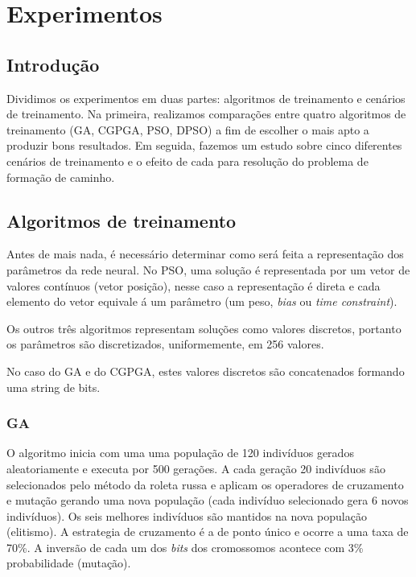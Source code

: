 \chapter{Experimentos}
\label{experimentos}

\section{Introdução}

Dividimos os experimentos em duas partes: algoritmos de treinamento e cenários de treinamento. Na primeira, realizamos comparações entre quatro algoritmos de treinamento (GA, CGPGA, PSO, DPSO) a fim de escolher o mais apto a produzir bons resultados. Em seguida, fazemos um estudo sobre cinco diferentes cenários de treinamento e o efeito de cada para resolução do problema de formação de caminho.

\section{Algoritmos de treinamento}

Antes de mais nada, é necessário determinar como será feita a representação dos parâmetros da rede neural. No PSO, uma solução é representada por um vetor de valores contínuos (vetor posição), nesse caso a representação é direta e cada elemento do vetor equivale á um parâmetro (um peso, \textit{bias} ou \textit{time constraint}).

Os outros três algoritmos representam soluções como valores discretos, portanto os parâmetros são discretizados, uniformemente, em 256 valores.

No caso do GA e do CGPGA, estes valores discretos são concatenados formando uma string de bits.

\subsection{GA}

O algoritmo inicia com uma uma população de 120 indivíduos gerados aleatoriamente e executa por 500 gerações. A cada geração 20 indivíduos são selecionados pelo método da roleta russa e aplicam os operadores de cruzamento e mutação gerando uma nova população (cada indivíduo selecionado gera 6 novos indivíduos). Os seis melhores indivíduos são mantidos na nova população (elitismo). A estrategia de cruzamento é a de ponto único e ocorre a uma taxa de 70\%. A inversão de cada um dos \textit{bits} dos cromossomos acontece com 3\% probabilidade (mutação).


